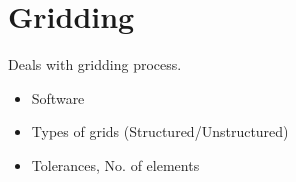 \section{Gridding}
Deals with gridding process.
\begin{itemize}
 \item Software
 \item Types of grids (Structured/Unstructured)
 \item Tolerances, No. of elements
\end{itemize}

